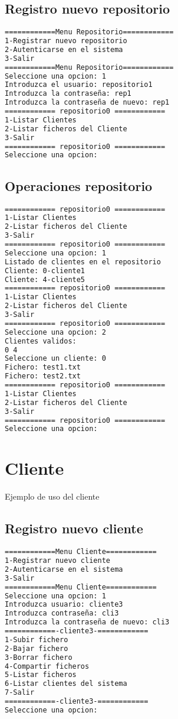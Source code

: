 \subsection{Registro nuevo repositorio}
\begin{lstlisting}[language=bash,frame=single,texcl=true,basicstyle=\small]
============Menu Repositorio============
1-Registrar nuevo repositorio
2-Autenticarse en el sistema
3-Salir
============Menu Repositorio============
Seleccione una opcion: 1
Introduzca el usuario: repositorio1
Introduzca la contraseña: rep1
Introduzca la contraseña de nuevo: rep1
============ repositorio0 ============
1-Listar Clientes
2-Listar ficheros del Cliente
3-Salir
============ repositorio0 ============
Seleccione una opcion: 
\end{lstlisting}
\subsection{Operaciones repositorio}
\begin{lstlisting}[language=bash,frame=single,texcl=true,basicstyle=\small]
============ repositorio0 ============
1-Listar Clientes
2-Listar ficheros del Cliente
3-Salir
============ repositorio0 ============
Seleccione una opcion: 1   
Listado de clientes en el repositorio
Cliente: 0-cliente1
Cliente: 4-cliente5
============ repositorio0 ============
1-Listar Clientes
2-Listar ficheros del Cliente
3-Salir
============ repositorio0 ============
Seleccione una opcion: 2
Clientes validos: 
0 4 
Seleccione un cliente: 0
Fichero: test1.txt
Fichero: test2.txt
============ repositorio0 ============
1-Listar Clientes
2-Listar ficheros del Cliente
3-Salir
============ repositorio0 ============
Seleccione una opcion: 
\end{lstlisting}

\section{Cliente}
Ejemplo de uso del cliente
\subsection{Registro nuevo cliente}
\begin{lstlisting}[language=bash,frame=single,texcl=true,basicstyle=\small]
============Menu Cliente============
1-Registrar nuevo cliente
2-Autenticarse en el sistema
3-Salir
============Menu Cliente============
Seleccione una opcion: 1
Introduzca usuario: cliente3
Introduzca contraseña: cli3
Introduzca la contraseña de nuevo: cli3
============-cliente3-============
1-Subir fichero
2-Bajar fichero
3-Borrar fichero
4-Compartir ficheros
5-Listar ficheros
6-Listar clientes del sistema
7-Salir
============-cliente3-============
Seleccione una opcion: 
\end{lstlisting}
